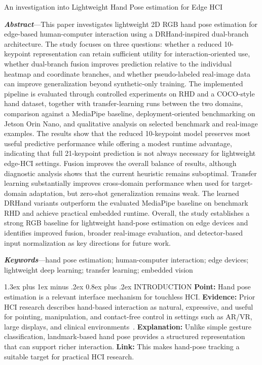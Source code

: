 \documentclass[10pt,letterpaper]{article}
\makeatletter
\renewcommand\section{\@startsection{section}{1}{\z@}%
  {1.3ex plus 1ex minus .2ex}%
  {0.8ex plus .2ex}%
  {\centering\normalfont\small\scshape}}
\makeatother
\begin{document}
\begin{center}
{\LARGE An investigation into Lightweight Hand Pose estimation for Edge HCI\par}
\end{center}

\vspace{0.6em}
\noindent\textbf{\textit{Abstract}}---This paper investigates lightweight 2D RGB hand pose estimation for edge-based human-computer interaction using a DRHand-inspired dual-branch architecture. The study focuses on three questions: whether a reduced 10-keypoint representation can retain sufficient utility for interaction-oriented use, whether dual-branch fusion improves prediction relative to the individual heatmap and coordinate branches, and whether pseudo-labeled real-image data can improve generalization beyond synthetic-only training. The implemented pipeline is evaluated through controlled experiments on RHD and a COCO-style hand dataset, together with transfer-learning runs between the two domains, comparison against a MediaPipe baseline, deployment-oriented benchmarking on Jetson Orin Nano, and qualitative analysis on selected benchmark and real-image examples. The results show that the reduced 10-keypoint model preserves most useful predictive performance while offering a modest runtime advantage, indicating that full 21-keypoint prediction is not always necessary for lightweight edge-HCI settings. Fusion improves the overall balance of results, although diagnostic analysis shows that the current heuristic remains suboptimal. Transfer learning substantially improves cross-domain performance when used for target-domain adaptation, but zero-shot generalization remains weak. The learned DRHand variants outperform the evaluated MediaPipe baseline on benchmark RHD and achieve practical embedded runtime. Overall, the study establishes a strong RGB baseline for lightweight hand-pose estimation on edge devices and identifies improved fusion, broader real-image evaluation, and detector-based input normalization as key directions for future work.

\vspace{0.6em}
\noindent\textbf{\textit{Keywords}}---hand pose estimation; human-computer interaction; edge devices; lightweight deep learning; transfer learning; embedded vision

\section{INTRODUCTION}
\noindent\textbf{Point:} Hand pose estimation is a relevant interface mechanism for touchless HCI.
\textbf{Evidence:} Prior HCI research describes hand-based interaction as natural, expressive, and useful for pointing, manipulation, and contact-free control in settings such as AR/VR, large displays, and clinical environments~\cite{vuletic,wachs,li_vr}.
\textbf{Explanation:} Unlike simple gesture classification, landmark-based hand pose provides a structured representation that can support richer interaction.
\textbf{Link:} This makes hand-pose tracking a suitable target for practical HCI research.
\end{document}
